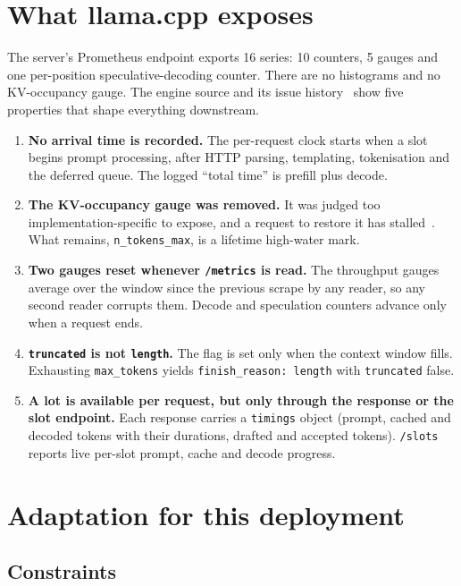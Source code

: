 \documentclass[11pt]{article}
\begin{document}
\section{What llama.cpp exposes}

The server's Prometheus endpoint exports 16 series: 10 counters, 5 gauges and one per-position
speculative-decoding counter. There are no histograms and no KV-occupancy gauge. The engine source
and its issue history~\citep{llamacpp_server,llamacpp_kv_issue} show five properties that shape
everything downstream.

\begin{enumerate}
\item \textbf{No arrival time is recorded.} The per-request clock starts when a slot begins prompt
processing, after HTTP parsing, templating, tokenisation and the deferred queue. The logged ``total
time'' is prefill plus decode.
\item \textbf{The KV-occupancy gauge was removed.} It was judged too implementation-specific to
expose, and a request to restore it has stalled~\citep{llamacpp_kv_issue}. What remains,
\texttt{n\_tokens\_max}, is a lifetime high-water mark.
\item \textbf{Two gauges reset whenever \texttt{/metrics} is read.} The throughput gauges average over
the window since the previous scrape by any reader, so any second reader corrupts them. Decode and
speculation counters advance only when a request ends.
\item \textbf{\texttt{truncated} is not \texttt{length}.} The flag is set only when the context window
fills. Exhausting \texttt{max\_tokens} yields \texttt{finish\_reason: length} with
\texttt{truncated} false.
\item \textbf{A lot is available per request, but only through the response or the slot endpoint.}
Each response carries a \texttt{timings} object (prompt, cached and decoded tokens with their
durations, drafted and accepted tokens). \texttt{/slots} reports live per-slot prompt, cache and
decode progress.
\end{enumerate}

\section{Adaptation for this deployment}

\subsection{Constraints}
\end{document}
